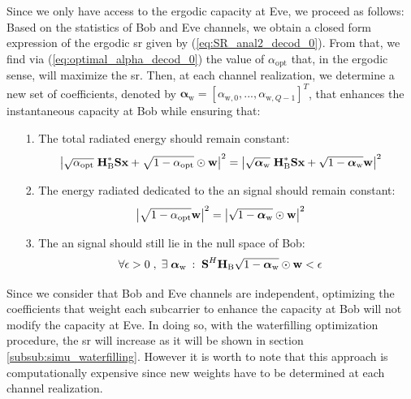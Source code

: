 Since we only have access to the ergodic capacity at Eve, we proceed as follows:\\
Based on the statistics of Bob and Eve channels, we obtain a closed form expression of the ergodic \gls{sr} given by (\ref{eq:SR_anal2_decod_0}). From that, we find via (\ref{eq:optimal_alpha_decod_0}) the value of $\alpha_{\text{opt}}$ that, in the ergodic sense, will maximize the \gls{sr}. Then, at each channel realization, we determine a new set of coefficients, denoted by $\boldsymbol\alpha_{\text{w}} = [\alpha_{\text{w},0},...,\alpha_{\text{w},Q-1}]^T $, that enhances the instantaneous capacity at Bob while ensuring that:
\begin{itemize}
    \item[1.] The total radiated energy should remain constant:
    \begin{equation}
        \left|\sqrt{\alpha_{\text{opt}}} \;\textbf{H}_{\text{B}}^* \textbf{S} \textbf{x} + \sqrt{1-\alpha_{\text{opt}}} \odot  \textbf{w} \right|^2  =   \left|\sqrt{\boldsymbol\alpha_{\text{w}}} \; \textbf{H}_{\text{B}}^* \textbf{S} \textbf{x} + \sqrt{1-\boldsymbol\alpha_{\text{w}}} \textbf{w} \right|^2
    \end{equation}
    \item[2.] The energy radiated dedicated to the \gls{an} signal should remain constant:
    \begin{equation}
        \left|\sqrt{1-\alpha_{\text{opt}}}\textbf{w}\right|^2 = \left|\sqrt{1-\boldsymbol\alpha_{\text{w}}} \odot\textbf{w}\right|^2
    \end{equation}
    \item[3.] The \gls{an} signal should still lie in the null space of Bob:
    \begin{equation}
        \forall \epsilon > 0 \; , \; \exists \;  \boldsymbol\alpha_{\text{w}} \: : \; \textbf{S}^H \textbf{H}_{\text{B}} \sqrt{1-\boldsymbol\alpha_{\text{w}}}\odot \textbf{w} < \epsilon
    \end{equation}
\end{itemize}
Since we consider that Bob and Eve channels are independent, optimizing the coefficients that weight each subcarrier to enhance the capacity at Bob will not modify the capacity at Eve. In doing so, with the waterfilling optimization procedure, the \gls{sr} will increase as it will be shown in section \ref{subsub:simu_waterfilling}. However it is worth to note that this approach is computationally expensive since new weights have to be determined at each channel realization.